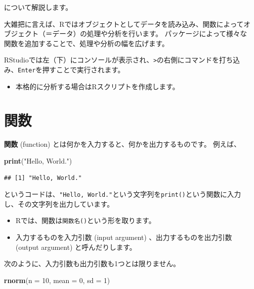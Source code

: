 \documentclass[]{bxjsreport}
\newenvironment{Shaded}{\begin{snugshade}}{\end{snugshade}}
\newcommand{\DataTypeTok}[1]{\textcolor[rgb]{0.13,0.29,0.53}{#1}}
\newcommand{\DecValTok}[1]{\textcolor[rgb]{0.00,0.00,0.81}{#1}}
\newcommand{\KeywordTok}[1]{\textcolor[rgb]{0.13,0.29,0.53}{\textbf{#1}}}
\newcommand{\NormalTok}[1]{#1}
\newcommand{\StringTok}[1]{\textcolor[rgb]{0.31,0.60,0.02}{#1}}
\providecommand{\tightlist}{%
  \setlength{\itemsep}{0pt}\setlength{\parskip}{0pt}}
\let\asdf\section
\renewcommand{\section}{\chapter}
\renewcommand{\subsection}{\asdf}
\begin{document}
について解説します。

大雑把に言えば、Rではオブジェクトとしてデータを読み込み、関数によってオブジェクト（＝データ）の処理や分析を行います。
パッケージによって様々な関数を追加することで、処理や分析の幅を広げます。

RStudioでは左（下）にコンソールが表示され、\texttt{\textgreater{}}の右側にコマンドを打ち込み、\texttt{Enter}を押すことで実行されます。

\begin{itemize}
\tightlist
\item
  本格的に分析する場合はRスクリプトを作成します。
\end{itemize}

\hypertarget{ux95a2ux6570}{%
\subsection{関数}\label{ux95a2ux6570}}

\textbf{関数} (function) とは何かを入力すると、何かを出力するものです。
例えば、

\begin{Shaded}
\begin{Highlighting}[]
\KeywordTok{print}\NormalTok{(}\StringTok{"Hello, World."}\NormalTok{)}
\end{Highlighting}
\end{Shaded}

\begin{verbatim}
## [1] "Hello, World."
\end{verbatim}

というコードは、\texttt{"Hello,\ World."}という文字列を\texttt{print()}という関数に入力し、その文字列を出力しています。

\begin{itemize}
\tightlist
\item
  Rでは、関数は\texttt{関数名()}という形を取ります。
\item
  入力するものを入力引数 (input argument) 、出力するものを出力引数 (output argument) と呼んだりします。
\end{itemize}

次のように、入力引数も出力引数も1つとは限りません。

\begin{Shaded}
\begin{Highlighting}[]
\KeywordTok{rnorm}\NormalTok{(}\DataTypeTok{n =} \DecValTok{10}\NormalTok{, }\DataTypeTok{mean =} \DecValTok{0}\NormalTok{, }\DataTypeTok{sd =} \DecValTok{1}\NormalTok{)}
\end{Highlighting}
\end{Shaded}
\end{document}
